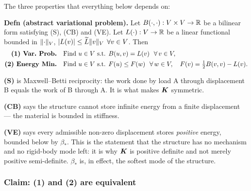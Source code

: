 \medskip
The three properties that everything below depends on:

\medskip\noindent{}

\medskip\noindent
\textbf{Defn (abstract variational problem).} Let
$B(\cdot,\cdot):V\times V\to\mathbb{R}$ be a bilinear form satisfying (S), (CB)
and (VE). Let $L(\cdot):V\to\mathbb{R}$ be a linear functional bounded in
$\lVert\cdot\rVert_{V}$, \ie $|L(v)|\le\widetilde{L}\lVert v\rVert_{V}$
$\forall v\in V$. Then
\begin{align}
  \textbf{(1) Var.\ Prob.}&\quad\text{Find } u\in V \text{ s.t. }
     B(u,v)=L(v)\ \ \forall\,v\in V,\label{eq:l13VP}\\
  \textbf{(2) Energy Min.}&\quad\text{Find } u\in V \text{ s.t. }
     F(u)\le F(w)\ \ \forall\,w\in V,\quad
     F(v)=\tfrac12 B(v,v)-L(v).\label{eq:l13EM}
\end{align}

\begin{mechanics}
\textbf{(S)} is Maxwell--Betti reciprocity: the work done by load A through
displacement B equals the work of B through A. It is what makes $\bm{K}$
symmetric.

\textbf{(CB)} says the structure cannot store infinite energy from a finite
displacement --- the material is bounded in stiffness.

\textbf{(VE)} says every admissible non-zero displacement stores
\emph{positive} energy, bounded below by $\beta_{*}$. This is the statement
that the structure has no mechanism and no rigid-body mode left: it is why
$\bm{K}$ is positive definite and not merely positive semi-definite.
$\beta_{*}$ is, in effect, the softest mode of the structure.
\end{mechanics}

\subsubsection*{Claim: (1) and (2) are equivalent}

